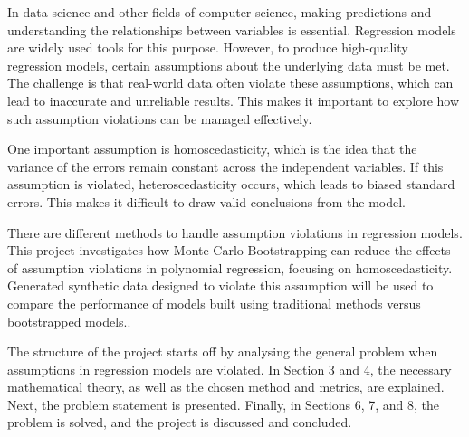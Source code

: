In data science and other fields of computer science, making predictions and understanding the relationships between variables is essential. Regression models are widely used tools for this purpose. However, to produce high-quality regression models, certain assumptions about the underlying data must be met. The challenge is that real-world data often violate these assumptions, which can lead to inaccurate and unreliable results. This makes it important to explore how such assumption violations can be managed effectively. \newline

\noindent One important assumption is homoscedasticity, which is the idea that the variance of the errors remain constant across the independent variables. If this assumption is violated, heteroscedasticity occurs, which leads to biased standard errors. This makes it difficult to draw valid conclusions from the model. \newline


\noindent There are different methods to handle assumption violations in regression models. This project investigates how Monte Carlo Bootstrapping can reduce the effects of assumption violations in polynomial regression, focusing on homoscedasticity. Generated synthetic data designed to violate this assumption will be used to compare the performance of models built using traditional methods versus bootstrapped models..\newline

\noindent The structure of the project starts off by analysing the general problem when assumptions in regression models are violated. In Section 3 and 4, the necessary mathematical theory, as well as the chosen method and metrics, are explained. Next, the problem statement is presented. Finally, in Sections 6, 7, and 8, the problem is solved, and the project is discussed and concluded.
